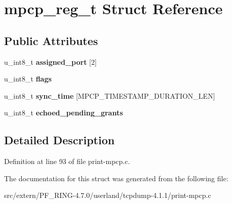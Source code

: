 \hypertarget{structmpcp__reg__t}{
\section{mpcp\_\-reg\_\-t Struct Reference}
\label{structmpcp__reg__t}
}
\subsection*{Public Attributes}
\begin{DoxyCompactItemize}
\item 
\hypertarget{structmpcp__reg__t_a9140a93038a79881a619269d79773bce}{
u\_\-int8\_\-t {\bfseries assigned\_\-port} \mbox{[}2\mbox{]}}
\label{structmpcp__reg__t_a9140a93038a79881a619269d79773bce}

\item 
\hypertarget{structmpcp__reg__t_a0fcf822cddfba7c2dba7f78bb7850c99}{
u\_\-int8\_\-t {\bfseries flags}}
\label{structmpcp__reg__t_a0fcf822cddfba7c2dba7f78bb7850c99}

\item 
\hypertarget{structmpcp__reg__t_ab0d0ce0e0d1d3f4f021adb25c2dfebfa}{
u\_\-int8\_\-t {\bfseries sync\_\-time} \mbox{[}MPCP\_\-TIMESTAMP\_\-DURATION\_\-LEN\mbox{]}}
\label{structmpcp__reg__t_ab0d0ce0e0d1d3f4f021adb25c2dfebfa}

\item 
\hypertarget{structmpcp__reg__t_a771f6888379fc2996323354f6e5f106f}{
u\_\-int8\_\-t {\bfseries echoed\_\-pending\_\-grants}}
\label{structmpcp__reg__t_a771f6888379fc2996323354f6e5f106f}

\end{DoxyCompactItemize}


\subsection{Detailed Description}


Definition at line 93 of file print-\/mpcp.c.



The documentation for this struct was generated from the following file:\begin{DoxyCompactItemize}
\item 
src/extern/PF\_\-RING-\/4.7.0/userland/tcpdump-\/4.1.1/print-\/mpcp.c\end{DoxyCompactItemize}
